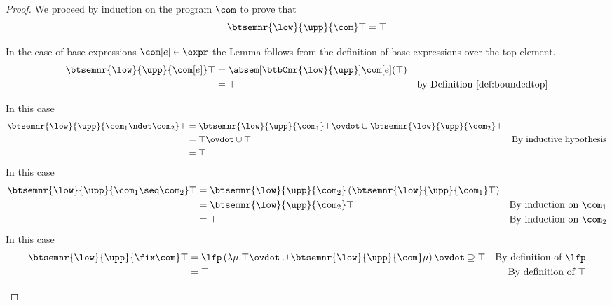 \begin{proof}
  We proceed by induction on the program \(\com\) to prove that
  \begin{equation*}
    \btsemnr{\low}{\upp}{\com}\top = \top
  \end{equation*}
  \begin{inductive}
    \case{\(\com[e]\)} In the case of base expressions
    \(\com[e]\in\expr\) the Lemma follows from the definition of
    base expressions over the top element.
    \begin{align*}
      \btsemnr{\low}{\upp}{\com[e]}\top & = \absem[\btbCnr{\low}{\upp}]{\com[e]}(\top) \\
                                      & = \top & \text{by Definition~\ref{def:boundedtop}}
    \end{align*}

     In this case
    \begin{align*}
      \btsemnr{\low}{\upp}{\com_1\ndet\com_2}\top & = \btsemnr{\low}{\upp}{\com_1}\top \ovdot\cup \btsemnr{\low}{\upp}{\com_2}\top \\
                                                & = \top \ovdot\cup \top & \text{By inductive hypothesis} \\
                                                & = \top
    \end{align*}
     In this case
    \begin{align*}
      \btsemnr{\low}{\upp}{\com_1\seq\com_2}\top & = \btsemnr{\low}{\upp}{\com_2}\left(\btsemnr{\low}{\upp}{\com_1}\top\right) \\
                                               & = \btsemnr{\low}{\upp}{\com_2}\top & \text{By induction on }\com_1 \\
                                               & = \top & \text{By induction on }\com_2
    \end{align*}
    \case{\(\fix\com\)} In this case
    \begin{align*}
      \btsemnr{\low}{\upp}{\fix\com}\top & = \lfp\left(\lambda \mu . \top \ovdot\cup \btsemnr{\low}{\upp}{\com}\mu\right) \ovdot\supseteq \top & \text{By definition of }\lfp \\
                                       & = \top & \text{By definition of }\top
    \end{align*}
  \end{inductive}
\end{proof}

